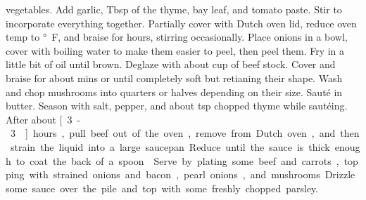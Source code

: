 \documentclass[11pt, letterpaper]{article}
\begin{document}
\begin{recipe}
{            vegetables. Add garlic, \unit[1]{Tbsp} of the thyme, bay leaf, and tomato paste.
            Stir to incorporate everything together.
      \step Partially cover with Dutch oven lid, reduce oven temp to \unit[325]{\degree F},
            and braise for \unit[3]{hours}, stirring occasionally.
      \step Place onions in a bowl, cover with boiling water to make them easier to peel,
            then peel them.
      \step Fry in a little bit of oil until brown. Deglaze with about \unit[1]{cup} of beef
            stock. Cover and braise for about \unit[45]{mins} or until completely soft but
            retianing their shape.
      \step Wash and chop mushrooms into quarters or halves depending on their size. Saut\'{e}
            in butter. Season with salt, pepper, and about \unit[1]{tsp} chopped thyme while
            saut\'{e}ing.
      \step After about \unit[3-3]{hours}, pull beef out of the oven, remove from
            Dutch oven, and then strain the liquid into a large saucepan. Reduce until the sauce
            is thick enough to coat the back of a spoon.
      \step Serve by plating some beef and carrots, topping with strained onions and bacon,
            pearl onions, and mushrooms. Drizzle some sauce over the pile and top with some
            freshly chopped parsley.
    }
  \end{recipe}
\end{document}
